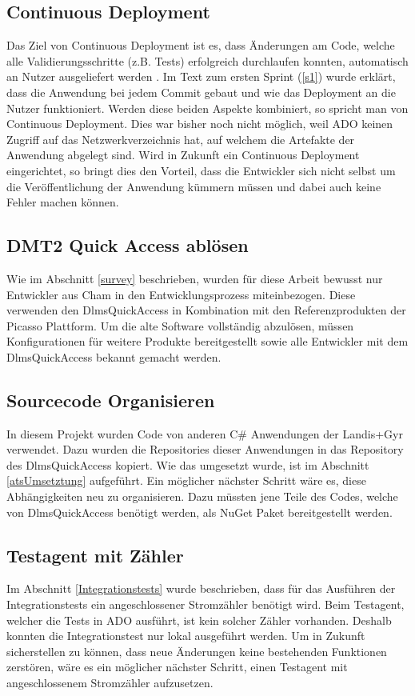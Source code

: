 \subsection{Continuous Deployment}
Das Ziel von Continuous Deployment ist es, dass Änderungen am Code, welche alle Validierungsschritte (z.B. Tests) erfolgreich durchlaufen konnten, automatisch an Nutzer ausgeliefert werden \parencite{atlassian_2019}.
Im Text zum ersten Sprint (\ref{s1}) wurde erklärt, dass die Anwendung bei jedem Commit gebaut und wie das Deployment an die Nutzer funktioniert.
Werden diese beiden Aspekte kombiniert, so spricht man von Continuous Deployment.
Dies war bisher noch nicht möglich, weil \ac{ADO} keinen Zugriff auf das Netzwerkverzeichnis hat, auf welchem die Artefakte der Anwendung abgelegt sind.
Wird in Zukunft ein Continuous Deployment eingerichtet, so bringt dies den Vorteil, dass die Entwickler sich nicht selbst um die Veröffentlichung der Anwendung kümmern müssen und dabei auch keine Fehler machen können.

\subsection{DMT2 Quick Access ablösen}\label{moreUser}
Wie im Abschnitt \ref{survey} beschrieben, wurden für diese Arbeit bewusst nur Entwickler aus Cham in den Entwicklungsprozess miteinbezogen.
Diese verwenden den DlmsQuickAccess in Kombination mit den Referenzprodukten der Picasso Plattform.
Um die alte Software vollständig abzulösen, müssen Konfigurationen für weitere Produkte bereitgestellt sowie alle Entwickler mit dem DlmsQuickAccess bekannt gemacht werden.


\subsection{Sourcecode Organisieren}\label{ausblick:ats_split}
In diesem Projekt wurden Code von anderen C\# Anwendungen der Landis+Gyr verwendet.
Dazu wurden die Repositories dieser Anwendungen in das Repository des DlmsQuickAccess kopiert.
Wie das umgesetzt wurde, ist im Abschnitt \ref{atsUmsetztung} aufgeführt. 
Ein möglicher nächster Schritt wäre es, diese Abhängigkeiten neu zu organisieren.
Dazu müssten jene Teile des Codes, welche von DlmsQuickAccess benötigt werden, als NuGet Paket bereitgestellt werden.


\subsection{Testagent mit Zähler}
Im Abschnitt \ref{Integrationstests} wurde beschrieben, dass für das Ausführen der Integrationstests ein angeschlossener Stromzähler benötigt wird.
Beim Testagent, welcher die Tests in \ac{ADO} ausführt, ist kein solcher Zähler vorhanden.
Deshalb konnten die Integrationstest nur lokal ausgeführt werden.
Um in Zukunft sicherstellen zu können, dass neue Änderungen keine bestehenden Funktionen zerstören, wäre es ein möglicher nächster Schritt, einen Testagent mit angeschlossenem Stromzähler aufzusetzen.

